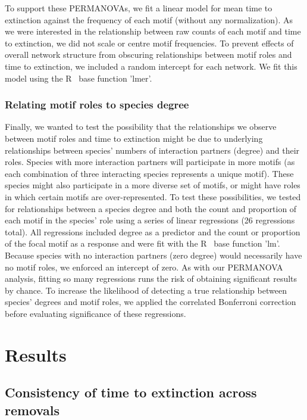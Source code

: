 \documentclass[12pt]{article}
\begin{document}
			To support these PERMANOVAs, we fit a linear model for mean time to extinction against the frequency of each motif (without any normalization).
			As we were interested in the relationship between raw counts of each motif and time to extinction, we did not scale or centre motif frequencies.
			To prevent effects of overall network structure from obscuring relationships between motif roles and time to extinction, we included a random intercept for each network.
			We fit this model using the R~\citep{R} base function 'lmer'.


		\subsubsection*{Relating motif roles to species degree}

			Finally, we wanted to test the possibility that the relationships we observe between motif roles and time to extinction might be due to underlying relationships between species' numbers of interaction partners (degree) and their roles.
			Species with more interaction partners will participate in more motifs (as each combination of three interacting species represents a unique motif).
			These species might also participate in a more diverse set of motifs, or might have roles in which certain motifs are over-represented.
			To test these possibilities, we tested for relationships between a species degree and both the count and proportion of each motif in the species' role using a series of linear regressions (26 regressions total).
			All regressions included degree as a predictor and the count or proportion of the focal motif as a response and were fit with the R~\citep{R} base function 'lm'.
			Because species with no interaction partners (zero degree) would necessarily have no motif roles, we enforced an intercept of zero.
			As with our PERMANOVA analysis, fitting so many regressions runs the risk of obtaining significant results by chance.
			To increase the likelihood of detecting a true relationship between species' degrees and motif roles, we applied the correlated Bonferroni correction~\citep{Drezner2016} before evaluating significance of these regressions.


\section{Results}
	
	\subsection*{Consistency of time to extinction across removals}
\end{document}
